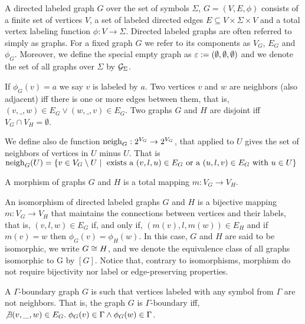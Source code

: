 \documentclass[]{report}
\begin{document}
\begin{definition}
	\label{def:graph}
	A directed labeled graph $G$ over the set of symbols $\Sigma$, $G = (V, E, \phi)$ consists of a finite set of vertices $V$, a set of labeled directed edges $E \subseteq V \times \Sigma \times V$ and a total vertex labeling function $\phi : V \to \Sigma$. Directed labeled graphs are often referred to simply as graphs. For a fixed graph $G$ we refer to its components as $V_G$, $E_G$ and $\phi_G$. Moreover, we define the special empty graph as $\emptyGraph := (\emptyset, \emptyset, \emptyset)$ and we denote the set of all graphs over $\Sigma$ by $\allgraphs{\Sigma}$.
	
	If $\phi_G(v) = a$ we say $v$ is labeled by $a$. Two vertices $v$ and $w$ are neighbors (also adjacent) iff there is one or more edges between them, that is, $(v,\_,w) \in E_G \lor (w,\_,v) \in E_G$. Two graphs $G$ and $H$ are disjoint iff $V_G \cap V_H = \emptyset$.
	
	We define also de function $\neigh{G}: 2^{V_G} \to 2^{V_G}$, that applied to $U$ gives the set of neighbors of vertices in $U$ minus $U$. That is $\neigh{G}(U) = \{ v \in V_G \setminus U \st \text{ exists a } (v,l,u) \in E_G \text{ or a } (u,l,v) \in E_G \text{ with } u \in U \}$
\end{definition}

\begin{definition}
	\label{def:morphism}
	A morphism of graphs $G$ and $H$ is a total mapping $m: V_G \to V_H$.
\end{definition}

\begin{definition}
	An isomorphism of directed labeled graphs $G$ and $H$ is a bijective mapping $m: V_G \to V_H$ that maintains the connections between vertices and their labels, that is, $(v,l,w) \in E_G$ if, and only if,  $(m(v),l,m(w)) \in E_H$ and if $m(v) = w$ then $\phi_G(v) = \phi_H(w)$. In this case, $G$ and $H$ are said to be isomorphic, we write $G \isomorph H$, and we denote the equivalence class of all graphs isomorphic to G by $[G]$.
	Notice that, contrary to isomorphisms, morphism do not require bijectivity nor label or edge-preserving properties.
\end{definition}

\begin{definition}
	A $\Gamma\text{-boundary}$ graph $G$ is such that vertices labeled with any symbol from $\Gamma$ are not neighbors. That is, the graph $G$ is $\Gamma\text{-boundary}$ iff, $\not\exists (v,\_,w) \in E_G \. \phi_G(v) \in \Gamma \land \phi_G(w) \in \Gamma$.
\end{definition}
\end{document}
